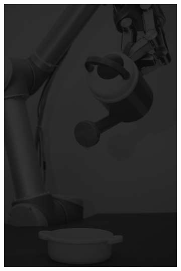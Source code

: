 \begin{figure}[H]
\begin{subfigure}[b]{0.1\textwidth}
        \includegraphics[width=\textwidth]{img3/test/contrast_5_0_2_final_img3.png}
    \end{subfigure}
    \begin{subfigure}[b]{0.1\textwidth}

\end{subfigure}
\end{figure}
